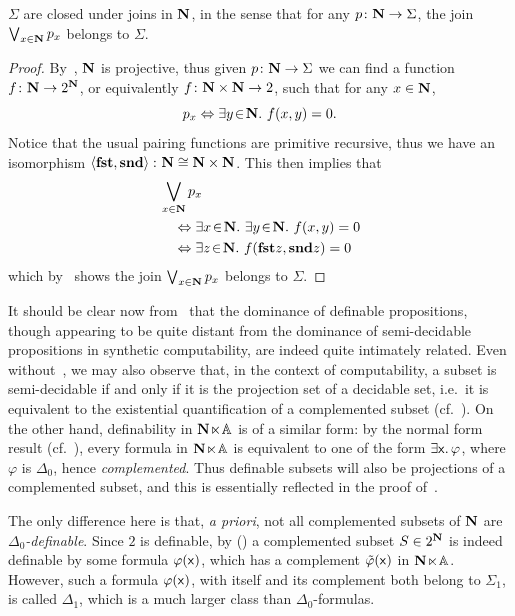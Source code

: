 \begin{proposition}\label{prop:Nbjoinclosure}
  $\Sigma$ are closed under joins in $\mathbf N$, in the sense that for any $p \colon \mathbf N \to \Sigma$, the join $\bigvee_{x\in\mathbf N}p_x$ belongs to $\Sigma$.
\end{proposition}
\begin{proof}
  By~, $\mathbf N$ is projective, thus given $p \colon \mathbf N \to \Sigma$ we can find a function $f \colon \mathbf N \to 2^\mathbf N$, or equivalently $f \colon \mathbf N \times \mathbf N \to 2$, such that for any $x\in\mathbf N$,
  \[ p_x \Leftrightarrow \exists y\!\in\!\mathbf N.\  f(x,y) = 0. \]
  Notice that the usual pairing functions are primitive recursive, thus we have an isomorphism $\left\langle\mathbf{fst},\mathbf{snd}\right\rangle \colon \mathbf N \cong \mathbf N \times \mathbf N$. This then implies that
  \begin{align*}
    &\bigvee_{x\in\mathbf N} p_x \\
    &\quad\Leftrightarrow \exists x\!\in\!\mathbf N.\  \exists y\!\in\!\mathbf N.\  f(x,y) = 0 \\
    &\quad\Leftrightarrow \exists z\!\in\!\mathbf N.\  f(\mathbf{fst}z,\mathbf{snd}z) = 0
  \end{align*}
  which by~ shows the join $\bigvee_{x\in\mathbf N}p_x$ belongs to $\Sigma$.
\end{proof}

\begin{remark}\label{rem:dominanceinariandcomp}
  It should be clear now from~ that the dominance of definable propositions, though appearing to be quite distant from the dominance of semi-decidable propositions in synthetic computability, are indeed quite intimately related. Even without~, we may also observe that, in the context of computability, a subset is semi-decidable if and only if it is the projection set of a decidable set, i.e.\ it is equivalent to the existential quantification of a complemented subset (cf.~\citet[Thm.~3.12 \& Prop.~3.13]{bauer_first_2006}). On the other hand, definability in $\mathbf N\hspace{-.4ex}\ltimes\hspace{-.4ex}\mathbb{A}$ is of a similar form: by the normal form result (cf.~), every formula in $\mathbf N\hspace{-.4ex}\ltimes\hspace{-.4ex}\mathbb{A}$ is equivalent to one of the form $\exists\mathsf{x}.\,\varphi$, where $\varphi$ is $\Delta_0$, hence \emph{complemented}. Thus definable subsets will also be projections of a complemented subset, and this is essentially reflected in the proof of~. 
  
  The only difference here is that, \emph{a priori}, not all complemented subsets of $\mathbf N$ are \emph{$\Delta_0$-definable}. Since $2$ is definable, by (\AxiomSQCA) a complemented subset $S\in 2^\mathbf N$ is indeed definable by some formula $\varphi(\mathsf{x})$, which has a complement $\tilde{\varphi}(\mathsf{x})$ in $\mathbf N\hspace{-.4ex}\ltimes\hspace{-.4ex}\mathbb{A}$. However, such a formula $\varphi(\mathsf{x})$, with itself and its complement both belong to $\Sigma_1$, is called $\Delta_1$, which is a much larger class than $\Delta_0$-formulas.
\end{remark}


